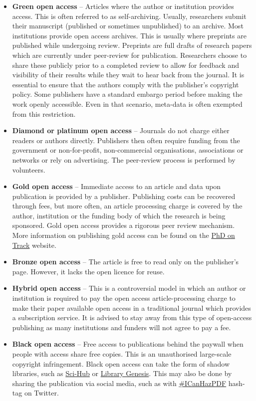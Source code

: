 \documentclass[
]{book}
\begin{document}
\begin{itemize}
\item
  \textbf{Green open access} -- Articles where the author or institution provides access. This is often referred to as self-archiving. Usually, researchers submit their manuscript (published or sometimes unpublished) to an archive. Most institutions provide open access archives. This is usually where preprints are published while undergoing review. Preprints are full drafts of research papers which are currently under peer-review for publication. Researchers choose to share these publicly prior to a completed review to allow for feedback and visibility of their results while they wait to hear back from the journal. It is essential to ensure that the authors comply with the publisher's copyright policy. Some publishers have a standard embargo period before making the work openly accessible. Even in that scenario, meta-data is often exempted from this restriction.
\item
  \textbf{Diamond or platinum open access} -- Journals do not charge either readers or authors directly. Publishers then often require funding from the government or non-for-profit, non-commercial organisations, associations or networks or rely on advertising. The peer-review process is performed by volunteers.
\item
  \textbf{Gold open access} -- Immediate access to an article and data upon publication is provided by a publisher. Publishing costs can be recovered through fees, but more often, an article processing charge is covered by the author, institution or the funding body of which the research is being sponsored. Gold open access provides a rigorous peer review mechanism. More information on publishing gold access can be found on the \href{https://www.phdontrack.net/open-science/open-access-publishing/\#toc3}{PhD on Track} website.
\item
  \textbf{Bronze open access} -- The article is free to read only on the publisher's page. However, it lacks the open licence for reuse.
\item
  \textbf{Hybrid open access} -- This is a controversial model in which an author or institution is required to pay the open access article-processing charge to make their paper available open access in a traditional journal which provides a subscription service. It is advised to stay away from this type of open-access publishing as many institutions and funders will not agree to pay a fee.
\item
  \textbf{Black open access} -- Free access to publications behind the paywall when people with access share free copies. This is an unauthorised large-scale copyright infringement. Black open access can take the form of shadow libraries, such as \href{https://en.wikipedia.org/wiki/Sci-Hub}{Sci-Hub} or \href{https://en.wikipedia.org/wiki/Library_Genesis}{Library Genesis}. This may also be done by sharing the publication via social media, such as with \href{https://en.wikipedia.org/wiki/ICanHazPDF}{\#ICanHazPDF} hash-tag on Twitter.
\end{itemize}
\end{document}
